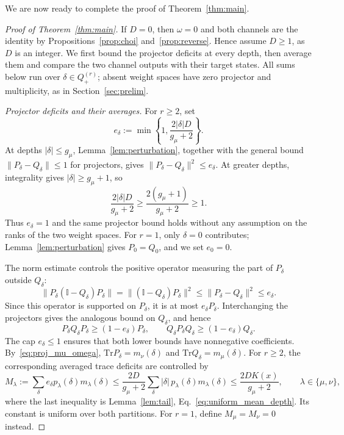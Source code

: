 \documentclass[a4paper,onecolumn,11pt]{quantumarticle}
\def\id{\mathbb{I}}
\newcommand*{\Tr}{\mathrm{Tr}}
\begin{document}
We are now ready to complete the proof of Theorem~\ref{thm:main}.

\begin{proof}[Proof of Theorem~\ref{thm:main}]
If $D=0$, then $\omega=0$ and both channels are the identity by
Propositions~\ref{prop:choi} and~\ref{prop:reverse}. Hence assume
$D\ge1$, as $D$ is an integer. We first bound the projector deficits
at every depth, then average them and compare the two channel outputs
with their target states. All sums below run over
$\delta\in Q_+^{(r)}$; absent weight spaces have zero
projector and multiplicity, as in Section~\ref{sec:prelim}.

\emph{Projector deficits and their averages.}
For $r\ge2$, set
\[
e_\delta:=\min\left\{1,\frac{2|\delta|D}{g_\mu+2}\right\}.
\]
At depths $|\delta|\le g_\mu$, Lemma~\ref{lem:perturbation}, together
with the general bound $\|P_\delta-Q_\delta\|\le1$ for
projectors, gives $\|P_\delta-Q_\delta\|^2\le e_\delta$.
At greater depths, integrality gives $|\delta|\ge g_\mu+1$, so
\[
\frac{2|\delta|D}{g_\mu+2}
\ge\frac{2(g_\mu+1)}{g_\mu+2}\ge1.
\]
Thus $e_\delta=1$ and the same projector bound holds without any
assumption on the ranks of the two weight spaces. For $r=1$, only
$\delta=0$ contributes; Lemma~\ref{lem:perturbation} gives
$P_0=Q_0$, and we set $e_0=0$.

The norm estimate controls the positive operator measuring the part
of $P_\delta$ outside $Q_\delta$:
\[
\|P_\delta(\id-Q_\delta)P_\delta\|
=\|(\id-Q_\delta)P_\delta\|^2
\le\|P_\delta-Q_\delta\|^2\le e_\delta.
\]
Since this operator is supported on $P_\delta$, it is at most
$e_\delta P_\delta$. Interchanging the projectors gives the analogous
bound on $Q_\delta$, and hence
\begin{equation}\label{eq:weight_block_bound}
P_\delta Q_\delta P_\delta\ge(1-e_\delta)P_\delta,\qquad
Q_\delta P_\delta Q_\delta\ge(1-e_\delta)Q_\delta.
\end{equation}
The cap $e_\delta\le1$ ensures that both lower bounds have
nonnegative coefficients. By~\eqref{eq:proj_mu_omega},
$\Tr P_\delta=m_\nu(\delta)$ and
$\Tr Q_\delta=m_\mu(\delta)$. For $r\ge2$, the corresponding
averaged trace deficits are controlled by
\begin{equation}\label{eq:averaged_projector_deficit}
M_\lambda:=\sum_\delta e_\delta p_\lambda(\delta)m_\lambda(\delta)
\le\frac{2D}{g_\mu+2}
\sum_\delta|\delta|\,p_\lambda(\delta)m_\lambda(\delta)
\le\frac{2D K(x)}{g_\mu+2},
\qquad \lambda\in\{\mu,\nu\},
\end{equation}
where the last inequality is Lemma~\ref{lem:tail},
Eq.~\eqref{eq:uniform_mean_depth}. Its constant is uniform over both
partitions. For $r=1$, define $M_\mu=M_\nu=0$ instead.


\end{proof}
\end{document}
